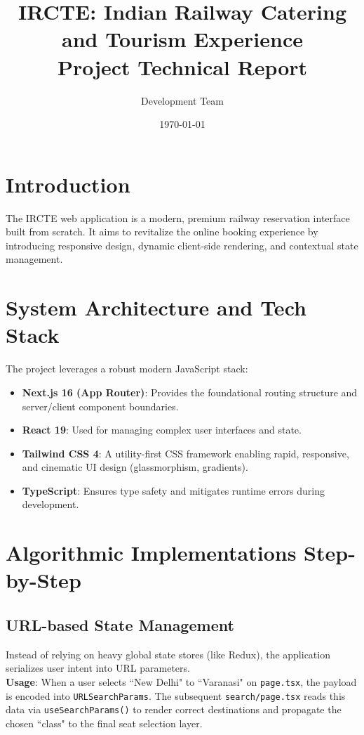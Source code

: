 \documentclass[12pt, a4paper]{article}
\title{\textbf{IRCTE: Indian Railway Catering and Tourism Experience}\\ \Large Project Technical Report}
\author{Development Team}
\date{\today}
\begin{document}
\maketitle
\tableofcontents
\newpage

\section{Introduction}
The IRCTE web application is a modern, premium railway reservation interface built from scratch. It aims to revitalize the online booking experience by introducing responsive design, dynamic client-side rendering, and contextual state management. 

\section{System Architecture and Tech Stack}
The project leverages a robust modern JavaScript stack:
\begin{itemize}
    \item \textbf{Next.js 16 (App Router)}: Provides the foundational routing structure and server/client component boundaries.
    \item \textbf{React 19}: Used for managing complex user interfaces and state.
    \item \textbf{Tailwind CSS 4}: A utility-first CSS framework enabling rapid, responsive, and cinematic UI design (glassmorphism, gradients).
    \item \textbf{TypeScript}: Ensures type safety and mitigates runtime errors during development.
\end{itemize}

\section{Algorithmic Implementations Step-by-Step}

\subsection{URL-based State Management}
Instead of relying on heavy global state stores (like Redux), the application serializes user intent into URL parameters. 
\\
\textbf{Usage}: When a user selects ``New Delhi" to ``Varanasi" on \texttt{page.tsx}, the payload is encoded into \texttt{URLSearchParams}. The subsequent \texttt{search/page.tsx} reads this data via \texttt{useSearchParams()} to render correct destinations and propagate the chosen ``class" to the final seat selection layer.
\end{document}
